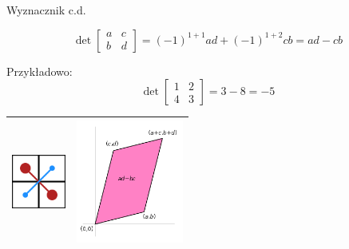 \documentclass[polish,10pt]{beamer}
\begin{document}
\begin{frame}{Wyznacznik c.d.}
\begin{example}
        \begin{equation*}
            \det \begin{bmatrix}
                a & c \\
                b & d
            \end{bmatrix} 
            = (-1)^{1+1}ad + (-1)^{1+2}cb = ad - cb
        \end{equation*}
        
        Przykładowo:
        \begin{equation*}
            \det \begin{bmatrix}
                1 & 2 \\
                4 & 3
            \end{bmatrix} 
            = 3 - 8 = -5
        \end{equation*}
    \end{example}
   \begin{center}
    \begin{tabular}{ |c|c| }
        \hline
        \includegraphics[width=50pt]{images/det_1.png} & \includegraphics[width=100pt]{images/det_2.png} \\
        \hline
    \end{tabular}
    \end{center}
\end{frame}
\end{document}
